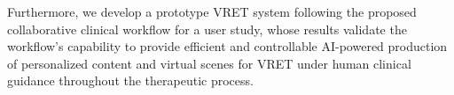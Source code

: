 \documentclass[]{interact}
\begin{document}
Furthermore, we develop a prototype VRET system following the proposed collaborative clinical workflow for a user study, whose results validate the workflow's capability to provide efficient and controllable AI-powered production of personalized content and virtual scenes for VRET under human clinical guidance throughout the therapeutic process.
\end{document}

